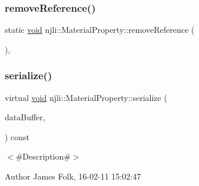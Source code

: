 \mbox{\label{classnjli_1_1_material_property_a9aedcf990d5787c531ae4126d1329c5e}} 
\subsubsection{\texorpdfstring{remove\+Reference()}{removeReference()}}
{\footnotesize\ttfamily static \mbox{\hyperlink{_thread_8h_af1e856da2e658414cb2456cb6f7ebc66}{void}} njli\+::\+Material\+Property\+::remove\+Reference (\begin{DoxyParamCaption}\item[{\mbox{\hyperlink{classnjli_1_1_material_property}{Material\+Property}} $\ast$}]{ }\end{DoxyParamCaption})\hspace{0.3cm}{\ttfamily [static]}, {\ttfamily [private]}}

\mbox{\label{classnjli_1_1_material_property_a5338183b33812c774e246c9d1827d666}} 
\subsubsection{\texorpdfstring{serialize()}{serialize()}}
{\footnotesize\ttfamily virtual \mbox{\hyperlink{_thread_8h_af1e856da2e658414cb2456cb6f7ebc66}{void}} njli\+::\+Material\+Property\+::serialize (\begin{DoxyParamCaption}\item[{\mbox{\hyperlink{_thread_8h_af1e856da2e658414cb2456cb6f7ebc66}{void}} $\ast$}]{data\+Buffer,  }\item[{bt\+Serializer $\ast$}]{ }\end{DoxyParamCaption}) const\hspace{0.3cm}{\ttfamily [virtual]}}



$<$\#\+Description\#$>$ 

\begin{DoxyAuthor}{Author}
James Folk, 16-\/02-\/11 15\+:02\+:47
\end{DoxyAuthor}

